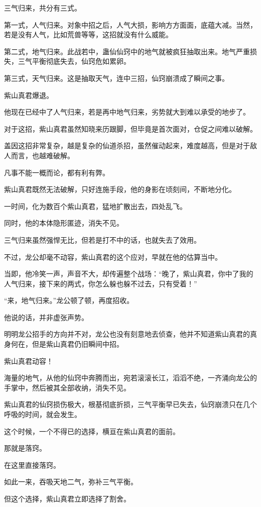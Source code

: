 \begin{this_body}
三气归来，共分有三式。

第一式，人气归来。对象中招之后，人气大损，影响方方面面，底蕴大减。当然，若是没有人气，比如荒兽等等，这招就没有什么威能。

第二式，地气归来。此战若中，蛊仙仙窍中的地气就被疯狂抽取出来。地气严重损失，三气平衡彻底失去，仙窍危如累卵。

第三式，天气归来。这是抽取天气，连中三招，仙窍崩溃成了瞬间之事。

紫山真君爆退。

他现在已经中了人气归来，若是再中地气归来，劣势就大到难以承受的地步了。

对于这招，紫山真君虽然知晓来历跟脚，但毕竟是首次面对，仓促之间难以破解。

盖因这招非常复杂，越是复杂的仙道杀招，虽然催动起来，难度越高，但是对于敌人而言，也越难破解。

凡事不能一概而论，都有利有弊。

紫山真君既然无法破解，只好连施手段，他的身影在顷刻间，不断地分化。

一时间，化为数百个紫山真君，猛地扩散出去，四处乱飞。

同时，他的本体隐形匿迹，消失不见。

三气归来虽然强悍无比，但若是打不中的话，也就失去了效用。

不过，龙公却毫不动容，紫山真君的这个应对，早就在他的估算当中。

当即，他冷笑一声，声音不大，却传遍整个战场：“晚了，紫山真君，你中了我的人气归来，接下来的两式，你怎么躲也躲不过去，只有受着！”

“来，地气归来。”龙公顿了顿，再度招收。

他说的话，并非虚张声势。

明明龙公招手的方向并不对，龙公也没有刻意地去侦查，他并不知道紫山真君的真身何在，但是紫山真君仍旧瞬间中招。

紫山真君动容！

海量的地气，从他的仙窍中奔腾而出，宛若滚滚长江，滔滔不绝，一齐涌向龙公的手掌中，然后被其全部收纳，消失不见。

紫山真君的仙窍损伤极大，根基彻底折损，三气平衡早已失去，仙窍崩溃只在几个呼吸的时间，就会发生。

这个时候，一个不得已的选择，横亘在紫山真君的面前。

那就是落窍。

在这里直接落窍。

如此一来，吞吸天地二气，弥补三气平衡。

但这个选择，紫山真君立即选择了割舍。


\end{this_body}
